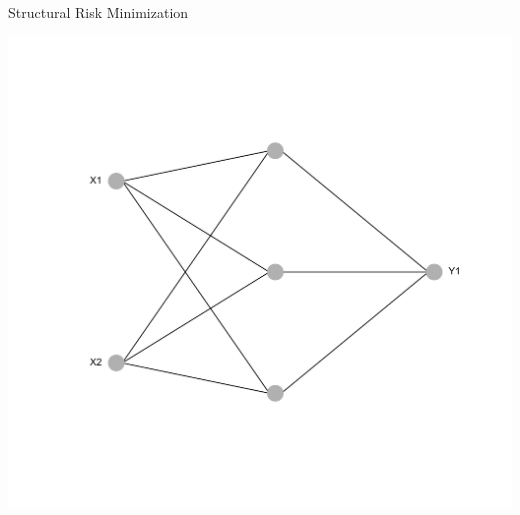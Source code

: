 \documentclass[11pt,compress,t,notes=noshow, xcolor=table]{beamer}
\begin{document}
\begin{frame} {Structural Risk Minimization}
{\begin{center}
\begin{minipage}{0.5\textwidth}
\end{minipage}%
\begin{minipage}{0.5\textwidth}
\includegraphics[width=\linewidth]{figure/nn_size_3.png}
\end{minipage}
\end{center}
}
\end{frame}
\end{document}
